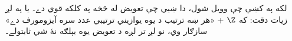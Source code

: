 \documentclass[../../../include/open-logic-section]{subfiles}
\begin{document}
لکه په  کښې چې وويل شول، دا ښيي
چې تعويض له  څخه
په کلکه قوي دے۔ يا په لږ زيات دقت: که $\Z$ + «هر ښه ترتيب د يوه
يوازيني ترتيبي عدد سره آيزومورف دے» سازګار وي، نو لږ تر لږه د
تعويض يوه بېلګه نۀ شي ثابتولے۔


\end{document}
